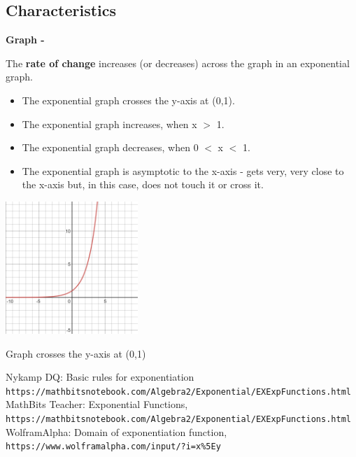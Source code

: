 \documentclass[letterpaper, 11pt]{report}
\begin{document}
\subsection*{Characteristics}
\begin{flushleft}
\textbf{Graph - }
 \end{flushleft}
\begin{flushleft}
\cite{mathbits}\cite{wolframalpha} The \textbf{rate of change} increases (or decreases) across the graph in an exponential graph.
\end{flushleft}
\begin{itemize}
\item \label{graph} The exponential graph crosses the y-axis at (0,1). 
\item The exponential graph increases, when x \(>\) 1.
\item The exponential graph decreases, when 0 \(<\) x \(<\) 1.
\item The exponential graph is asymptotic to the x-axis - gets very, very close to the x-axis but, in this case, does not touch it or cross it.
\end{itemize}
\begin{center}
\includegraphics[width=5cm]{x^y}
\end{center}
\begin{center}
Graph crosses the y-axis at (0,1)\end{center}
\begin{thebibliography}{}
Nykamp DQ: Basic rules for exponentiation
\\\texttt{https://mathbitsnotebook.com/Algebra2/Exponential/EXExpFunctions.html}
MathBits Teacher: Exponential Functions,
\\\texttt{https://mathbitsnotebook.com/Algebra2/Exponential/EXExpFunctions.html}
WolframAlpha: Domain of exponentiation function,
\\\texttt{https://www.wolframalpha.com/input/?i=x\%5Ey}
\end{thebibliography}
\newpage
{}
\end{document}
